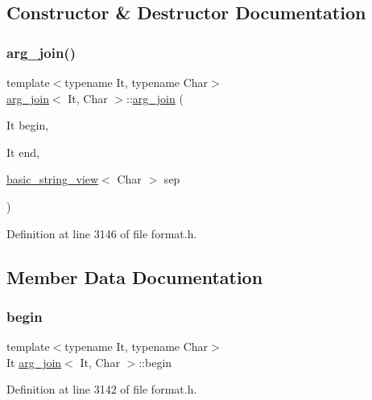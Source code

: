 \subsection{Constructor \& Destructor Documentation}
\mbox{\label{structarg__join_a15d46ecf09e348bc6a1661b01b07f793}} 
\subsubsection{\texorpdfstring{arg\+\_\+join()}{arg\_join()}}
{\footnotesize\ttfamily template$<$typename It, typename Char$>$ \\
\hyperlink{structarg__join}{arg\+\_\+join}$<$ It, Char $>$\+::\hyperlink{structarg__join}{arg\+\_\+join} (\begin{DoxyParamCaption}\item[{It}]{begin,  }\item[{It}]{end,  }\item[{\hyperlink{classbasic__string__view}{basic\+\_\+string\+\_\+view}$<$ Char $>$}]{sep }\end{DoxyParamCaption})\hspace{0.3cm}{\ttfamily [inline]}}



Definition at line 3146 of file format.\+h.



\subsection{Member Data Documentation}
\mbox{\label{structarg__join_ac8f29af772de01a375a649dbb41ea3cc}} 
\subsubsection{\texorpdfstring{begin}{begin}}
{\footnotesize\ttfamily template$<$typename It, typename Char$>$ \\
It \hyperlink{structarg__join}{arg\+\_\+join}$<$ It, Char $>$\+::begin}



Definition at line 3142 of file format.\+h.

\mbox{\label{structarg__join_a01b412e9e99d7fad229fcd9a7a4bede7}} 
